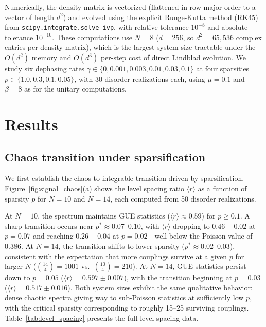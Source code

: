 \documentclass[aps,prd,twocolumn,superscriptaddress,nofootinbib,floatfix]{revtex4-2}
\newcommand{\avg}[1]{\langle #1 \rangle}
\begin{document}
Numerically, the density matrix is vectorized (flattened in row-major
order to a vector of length $d^2$) and evolved using the explicit
Runge-Kutta method (RK45) from \texttt{scipy.integrate.solve\_ivp}, with
relative tolerance $10^{-8}$ and absolute tolerance $10^{-10}$.
These computations use $N=8$ ($d = 256$, so $d^2 = 65{,}536$ complex
entries per density matrix), which is the largest system size tractable
under the $O(d^2)$ memory and $O(d^3)$ per-step cost of direct Lindblad
evolution. We study six dephasing rates
$\gamma \in \{0, 0.001, 0.003, 0.01, 0.03, 0.1\}$ at four sparsities
$p \in \{1.0, 0.3, 0.1, 0.05\}$, with $30$ disorder realizations each,
using $\mu = 0.1$ and $\beta = 8$ as for the unitary computations.

\section{Results}
\label{sec:results}

\subsection{Chaos transition under sparsification}
\label{sec:chaos_transition}

We first establish the chaos-to-integrable transition driven by
sparsification. Figure~\ref{fig:signal_chaos}(a) shows the level spacing
ratio $\avg{r}$ as a function of sparsity $p$ for $N=10$ and $N=14$, each
computed from 50 disorder realizations.

At $N=10$, the spectrum maintains GUE statistics ($\avg{r} \approx 0.59$)
for $p \geq 0.1$. A sharp transition occurs near $p^* \approx 0.07$--$0.10$,
with $\avg{r}$ dropping to $0.46 \pm 0.02$ at $p=0.07$ and reaching
$0.26 \pm 0.04$ at $p=0.02$---well below the Poisson value of 0.386.
At $N=14$, the transition shifts to lower sparsity
($p^* \approx 0.02$--$0.03$), consistent with the expectation that more
couplings survive at a given $p$ for larger $N$
($\binom{14}{4} = 1001$ vs.\ $\binom{10}{4} = 210$). At $N=14$, GUE
statistics persist down to $p = 0.05$ ($\avg{r} = 0.597 \pm 0.007$),
with the transition beginning at $p=0.03$ ($\avg{r} = 0.517 \pm 0.016$).
Both system sizes exhibit the same qualitative behavior: dense chaotic
spectra giving way to sub-Poisson statistics at sufficiently low $p$,
with the critical sparsity corresponding to roughly 15--25 surviving
couplings.  Table~\ref{tab:level_spacing} presents the full level spacing
data.
\end{document}

